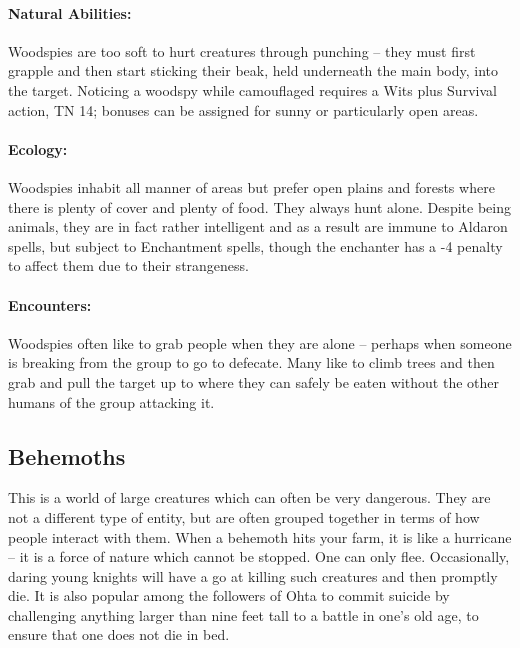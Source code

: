 \begin{multicols}{2}
\begin{boxtext}
\end{boxtext}

\paragraph{Natural Abilities:} Woodspies are too soft to hurt creatures through punching -- they must first grapple and then start sticking their beak, held underneath the main body, into the target.
Noticing a woodspy while camouflaged requires a Wits plus Survival action, TN 14; bonuses can be assigned for sunny or particularly open areas.

\woodspy

\paragraph{Ecology:} Woodspies inhabit all manner of areas but prefer open plains and forests where there is plenty of cover and plenty of food.  They always hunt alone.  Despite being animals, they are in fact rather intelligent and as a result are immune to Aldaron spells, but subject to Enchantment spells, though the enchanter has a -4 penalty to affect them due to their strangeness.

\paragraph{Encounters:} Woodspies often like to grab people when they are alone -- perhaps when someone is breaking from the group to go to defecate.  Many like to climb trees and then grab and pull the target up to where they can safely be eaten without the other humans of the group attacking it.

\subsection{Behemoths}

This is a world of large creatures which can often be very dangerous.  They are not a different type of entity, but are often grouped together in terms of how people interact with them.  When a behemoth hits your farm, it is like a hurricane -- it is a force of nature which cannot be stopped.  One can only flee.  Occasionally, daring young knights will have a go at killing such creatures and then promptly die.  It is also popular among the followers of Ohta to commit suicide by challenging anything larger than nine feet tall to a battle in one's old age, to ensure that one does not die in bed.


\end{multicols}
